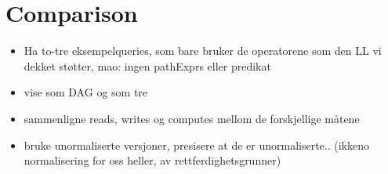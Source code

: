 \section{Comparison}
\label{sect:results:comparison}
\begin{itemize}
  \item Ha to-tre eksempelqueries, som bare bruker de operatorene som den LL vi dekket st\o tter, mao: ingen
  pathExprs eller predikat
  \item vise som DAG og som tre
  \item sammenligne reads, writes og computes mellom de forskjellige m\aa tene
  \item bruke unormaliserte versjoner, presisere at de er unormaliserte.. (ikkeno normalisering for oss heller, av
  rettferdighetsgrunner)
  \end{itemize}